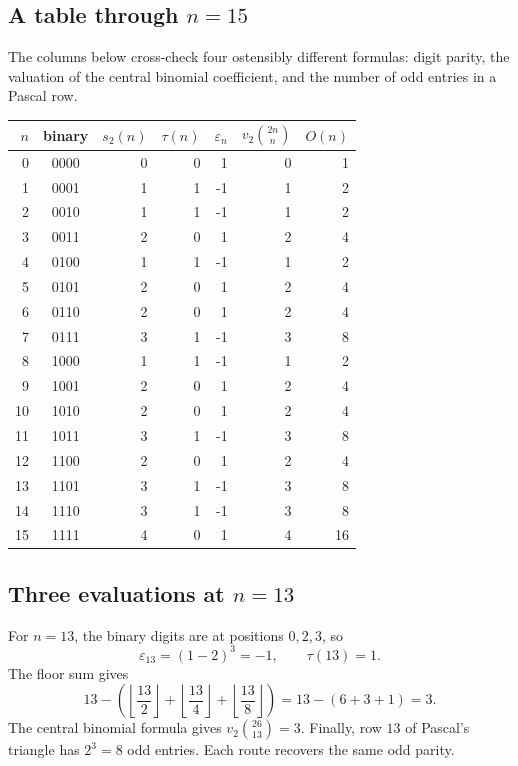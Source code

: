 \documentclass[11pt,oneside]{article}
\theoremstyle{definition}
\theoremstyle{remark}
\newcommand{\swt}{s_2}
\newcommand{\vtwo}{v_2}
\newcommand{\eps}{\varepsilon}
\newcommand{\1}{\mathbf 1}
\begin{document}
\subsection{A table through \(n=15\)}

The columns below cross-check four ostensibly different formulas: digit parity, the valuation
of the central binomial coefficient, and the number of odd entries in a Pascal row.

\begin{center}
\small
\begin{tabular}{@{}rcrrrrr@{}}
\toprule
\(n\) & binary & \(\swt(n)\) & \(\tau(n)\) & \(\eps_n\) &
\(\vtwo\binom{2n}{n}\) & \(O(n)\)\\
\midrule
0  & 0000 & 0 & 0 &  1 & 0 & 1\\
1  & 0001 & 1 & 1 & -1 & 1 & 2\\
2  & 0010 & 1 & 1 & -1 & 1 & 2\\
3  & 0011 & 2 & 0 &  1 & 2 & 4\\
4  & 0100 & 1 & 1 & -1 & 1 & 2\\
5  & 0101 & 2 & 0 &  1 & 2 & 4\\
6  & 0110 & 2 & 0 &  1 & 2 & 4\\
7  & 0111 & 3 & 1 & -1 & 3 & 8\\
8  & 1000 & 1 & 1 & -1 & 1 & 2\\
9  & 1001 & 2 & 0 &  1 & 2 & 4\\
10 & 1010 & 2 & 0 &  1 & 2 & 4\\
11 & 1011 & 3 & 1 & -1 & 3 & 8\\
12 & 1100 & 2 & 0 &  1 & 2 & 4\\
13 & 1101 & 3 & 1 & -1 & 3 & 8\\
14 & 1110 & 3 & 1 & -1 & 3 & 8\\
15 & 1111 & 4 & 0 &  1 & 4 & 16\\
\bottomrule
\end{tabular}
\end{center}

\subsection{Three evaluations at \(n=13\)}

For \(n=13\), the binary digits are at positions \(0,2,3\), so
\[
 \eps_{13}=(1-2)^3=-1,
 \qquad
 \tau(13)=1.
\]
The floor sum gives
\[
 13-\left(\left\lfloor\frac{13}{2}\right\rfloor
 +\left\lfloor\frac{13}{4}\right\rfloor
 +\left\lfloor\frac{13}{8}\right\rfloor\right)
 =13-(6+3+1)=3.
\]
The central binomial formula gives
\(\vtwo\binom{26}{13}=3\).  Finally, row \(13\) of Pascal's triangle has
\(2^3=8\) odd entries.  Each route recovers the same odd parity.
\end{document}
